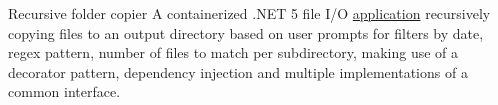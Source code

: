 {Recursive folder copier}
{}
{A containerized .NET 5 file I/O \href{https://github.com/JacobArchambault/FolderSearch}{application} recursively copying files to an output directory based on user prompts for filters by date, regex pattern, number of files to match per subdirectory, making use of a decorator pattern, dependency injection and multiple implementations of a common interface.}
